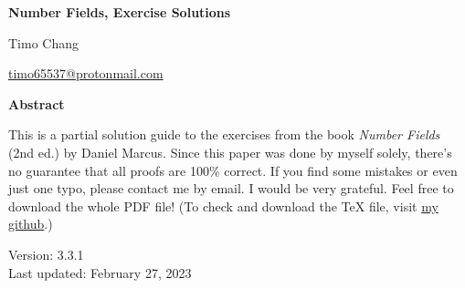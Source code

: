 \documentclass[11pt]{amsbook}
\makeatletter
\theoremstyle{plain}
\theoremstyle{definition}
\theoremstyle{remark}
\newcommand{\myToC}{{
  \renewcommand{\contentsname}{Contents}
  \@starttoc{toc}{\contentsname}
}}
\makeatother
\begin{document}
\begin{titlepage}
\begin{center}
\vspace*{1cm}

\LARGE
\textbf{Number Fields, Exercise Solutions}

\vspace{1.5cm}
\LARGE Timo Chang

\vspace{0.5cm}
\large \url{timo65537@protonmail.com}

\vspace{2cm}
\textbf{Abstract}
\vspace{0.3cm}
\end{center}

This is a partial solution guide to the exercises from the book \textit{Number Fields} (2nd ed.) by Daniel Marcus. Since this paper was done by myself solely, there's no guarantee that all proofs are 100\% correct. If you find some mistakes or even just one typo, please contact me by email. I would be very grateful. Feel free to download the whole PDF file! (To check and download the \mbox{\TeX} file, visit \href{https://github.com/bettertimo/number-fields-solutions}{my github}.)

\begin{center}
\vfill

Version: 3.3.1 \\
Last updated: February 27, 2023
\end{center}

\end{titlepage}

\setcounter{tocdepth}{2}
\myToC





\end{document}
